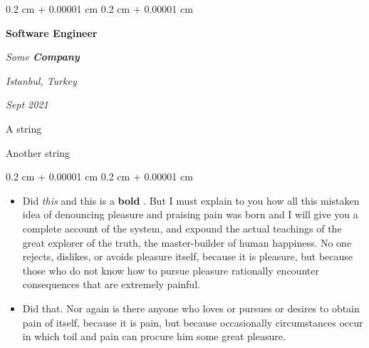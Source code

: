 \documentclass[10pt, letterpaper]{article}
\newenvironment{summary}{
    \begin{description}[
        topsep=0.10 cm,
        parsep=0.10 cm,
        partopsep=0pt,
        itemsep=0pt,
        leftmargin=0.4 cm + 10pt
    ]
}{
    \end{description}
} %
\newenvironment{highlights}{
    \begin{itemize}[
        topsep=0.10 cm,
        parsep=0.10 cm,
        partopsep=0pt,
        itemsep=0pt,
        leftmargin=0.4 cm + 10pt
    ]
}{
    \end{itemize}
} %
\newenvironment{onecolentry}{
    \begin{adjustwidth}{
        0.2 cm + 0.00001 cm
    }{
        0.2 cm + 0.00001 cm
    }
}{
    \end{adjustwidth}
} %
\newenvironment{twocolentry}[2][]{
    \onecolentry
    \def\secondColumn{#2}
    \setcolumnwidth{\fill, 4.5 cm}
    \begin{paracol}{2}
}{
    \switchcolumn \raggedleft \secondColumn
    \end{paracol}
    \endonecolentry
} %
\let\hrefWithoutArrow\href
\renewcommand{\href}[2]{\hrefWithoutArrow{#1}{\ifthenelse{\equal{#2}{}}{ }{#2 }\raisebox{.15ex}{\footnotesize \faExternalLink*}}}
\begin{document}
        \begin{twocolentry}{
        \textit{Istanbul, Turkey}    
            
        \textit{Sept 2021}}
            \textbf{Software Engineer}
            
            \textit{Some \textbf{Company}}
        \end{twocolentry}
            \begin{summary}
                \item A string
                \item Another string
            \end{summary}
        \vspace{0.10 cm}
        \begin{onecolentry}
            \begin{highlights}
                \item Did \textit{this} and this is a \textbf{bold} \href{https://example.com}{link}. But I must explain to you how all this mistaken idea of denouncing pleasure and praising pain was born and I will give you a complete account of the system, and expound the actual teachings of the great explorer of the truth, the master-builder of human happiness. No one rejects, dislikes, or avoids pleasure itself, because it is pleasure, but because those who do not know how to pursue pleasure rationally encounter consequences that are extremely painful.
                \item Did that. Nor again is there anyone who loves or pursues or desires to obtain pain of itself, because it is pain, but because occasionally circumstances occur in which toil and pain can procure him some great pleasure.
            \end{highlights}
        \end{onecolentry}


        \vspace{0.2 cm}
\end{document}
